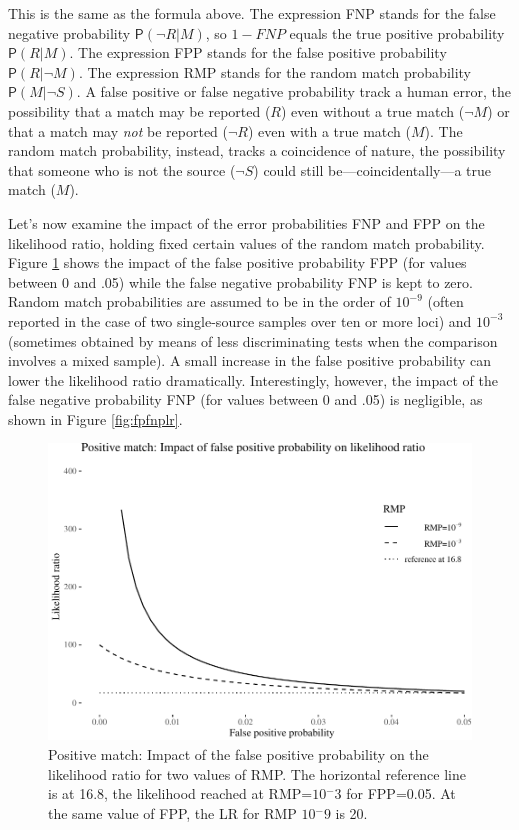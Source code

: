 \documentclass[
  10pt,
  dvipsnames,enabledeprecatedfontcommands]{scrartcl}
\newcommand{\n}{\neg}
\newcommand{\pr}[1]{\mathsf{P}(#1)}
\begin{document}
\noindent This is the same as the formula above. The expression FNP
stands for the false negative probability \(\pr{\neg R \vert M}\), so
\(1-FNP\) equals the true positive probability \(\pr{R \vert M}\). The
expression FPP stands for the false positive probability
\(\pr{R \vert \n M}\). The expression RMP stands for the random match
probability \(\pr{M\vert \n S}\). A false positive or false negative
probability track a human error, the possibility that a match may be
reported (\(R\)) even without a true match (\(\neg M\)) or that a match
may \textit{not} be reported (\(\neg R\)) even with a true match
(\(M\)). The random match probability, instead, tracks a coincidence of
nature, the possibility that someone who is not the source (\(\neg S\))
could still be---coincidentally---a true match (\(M\)).

Let's now examine the impact of the error probabilities FNP and FPP on
the likelihood ratio, holding fixed certain values of the random match
probability. Figure \ref{fig:fpplr} shows the impact of the false
positive probability FPP (for values between 0 and .05) while the false
negative probability FNP is kept to zero. Random match probabilities are
assumed to be in the order of \(10^{-9}\) (often reported in the case of
two single-source samples over ten or more loci) and \(10^{-3}\)
(sometimes obtained by means of less discriminating tests when the
comparison involves a mixed sample). A small increase in the false
positive probability can lower the likelihood ratio dramatically.
Interestingly, however, the impact of the false negative probability FNP
(for values between 0 and .05) is negligible, as shown in Figure
\ref{fig:fpfnplr}.

\begin{figure}

\begin{center}\includegraphics[width=1\linewidth]{lr-chapter4_files/figure-latex/fig-fpplr-1} \end{center}
\caption{Positive match: Impact of the false positive probability on the likelihood ratio for two values of RMP. The horizontal reference line is at 16.8, the likelihood reached at RMP=$10{^-3}$ for FPP=0.05. At the same value of FPP, the LR for RMP $10{^-9}$ is 20.}
\label{fig:fpplr}
\end{figure}
\end{document}
